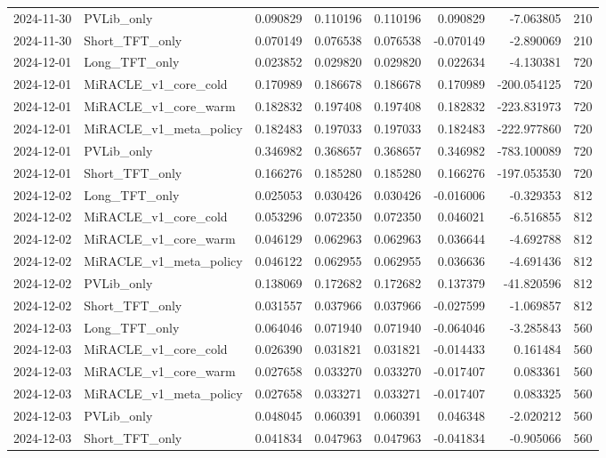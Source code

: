 \begin{tabular}{llrrrrrr}
2024-11-30 & PVLib_only & 0.090829 & 0.110196 & 0.110196 & 0.090829 & -7.063805 & 210 \\
2024-11-30 & Short_TFT_only & 0.070149 & 0.076538 & 0.076538 & -0.070149 & -2.890069 & 210 \\
2024-12-01 & Long_TFT_only & 0.023852 & 0.029820 & 0.029820 & 0.022634 & -4.130381 & 720 \\
2024-12-01 & MiRACLE_v1_core_cold & 0.170989 & 0.186678 & 0.186678 & 0.170989 & -200.054125 & 720 \\
2024-12-01 & MiRACLE_v1_core_warm & 0.182832 & 0.197408 & 0.197408 & 0.182832 & -223.831973 & 720 \\
2024-12-01 & MiRACLE_v1_meta_policy & 0.182483 & 0.197033 & 0.197033 & 0.182483 & -222.977860 & 720 \\
2024-12-01 & PVLib_only & 0.346982 & 0.368657 & 0.368657 & 0.346982 & -783.100089 & 720 \\
2024-12-01 & Short_TFT_only & 0.166276 & 0.185280 & 0.185280 & 0.166276 & -197.053530 & 720 \\
2024-12-02 & Long_TFT_only & 0.025053 & 0.030426 & 0.030426 & -0.016006 & -0.329353 & 812 \\
2024-12-02 & MiRACLE_v1_core_cold & 0.053296 & 0.072350 & 0.072350 & 0.046021 & -6.516855 & 812 \\
2024-12-02 & MiRACLE_v1_core_warm & 0.046129 & 0.062963 & 0.062963 & 0.036644 & -4.692788 & 812 \\
2024-12-02 & MiRACLE_v1_meta_policy & 0.046122 & 0.062955 & 0.062955 & 0.036636 & -4.691436 & 812 \\
2024-12-02 & PVLib_only & 0.138069 & 0.172682 & 0.172682 & 0.137379 & -41.820596 & 812 \\
2024-12-02 & Short_TFT_only & 0.031557 & 0.037966 & 0.037966 & -0.027599 & -1.069857 & 812 \\
2024-12-03 & Long_TFT_only & 0.064046 & 0.071940 & 0.071940 & -0.064046 & -3.285843 & 560 \\
2024-12-03 & MiRACLE_v1_core_cold & 0.026390 & 0.031821 & 0.031821 & -0.014433 & 0.161484 & 560 \\
2024-12-03 & MiRACLE_v1_core_warm & 0.027658 & 0.033270 & 0.033270 & -0.017407 & 0.083361 & 560 \\
2024-12-03 & MiRACLE_v1_meta_policy & 0.027658 & 0.033271 & 0.033271 & -0.017407 & 0.083325 & 560 \\
2024-12-03 & PVLib_only & 0.048045 & 0.060391 & 0.060391 & 0.046348 & -2.020212 & 560 \\
2024-12-03 & Short_TFT_only & 0.041834 & 0.047963 & 0.047963 & -0.041834 & -0.905066 & 560 \\

\end{tabular}
